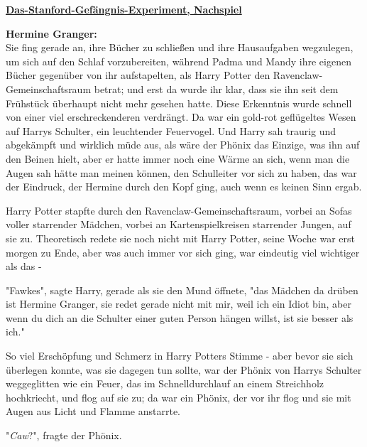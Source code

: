 

\hypertarget{das-stanford-gefuxe4ngnis-experiment-nachspiel}{%

\textbf{\uline{Das-Stanford-Gefängnis-Experiment, Nachspiel}}

\textbf{Hermine Granger:}\\ Sie fing gerade an, ihre Bücher zu schließen und ihre Hausaufgaben wegzulegen, um sich auf den Schlaf vorzubereiten, während Padma und Mandy ihre eigenen Bücher gegenüber von ihr aufstapelten, als Harry Potter den Ravenclaw-Gemeinschaftsraum betrat; und erst da wurde ihr klar, dass sie ihn seit dem Frühstück überhaupt nicht mehr gesehen hatte. Diese Erkenntnis wurde schnell von einer viel erschreckenderen verdrängt. Da war ein gold-rot geflügeltes Wesen auf Harrys Schulter, ein leuchtender Feuervogel. Und Harry sah traurig und abgekämpft und wirklich müde aus, als wäre der Phönix das Einzige, was ihn auf den Beinen hielt, aber er hatte immer noch eine Wärme an sich, wenn man die Augen sah hätte man meinen können, den Schulleiter vor sich zu haben, das war der Eindruck, der Hermine durch den Kopf ging, auch wenn es keinen Sinn ergab.

Harry Potter stapfte durch den Ravenclaw-Gemeinschaftsraum, vorbei an Sofas voller starrender Mädchen, vorbei an Kartenspielkreisen starrender Jungen, auf sie zu. Theoretisch redete sie noch nicht mit Harry Potter, seine Woche war erst morgen zu Ende, aber was auch immer vor sich ging, war eindeutig viel wichtiger als das -

"Fawkes", sagte Harry, gerade als sie den Mund öffnete, "das Mädchen da drüben ist Hermine Granger, sie redet gerade nicht mit mir, weil ich ein Idiot bin, aber wenn du dich an die Schulter einer guten Person hängen willst, ist sie besser als ich."

So viel Erschöpfung und Schmerz in Harry Potters Stimme - aber bevor sie sich überlegen konnte, was sie dagegen tun sollte, war der Phönix von Harrys Schulter weggeglitten wie ein Feuer, das im Schnelldurchlauf an einem Streichholz hochkriecht, und flog auf sie zu; da war ein Phönix, der vor ihr flog und sie mit Augen aus Licht und Flamme anstarrte.

"\emph{Caw}?", fragte der Phönix.

}
